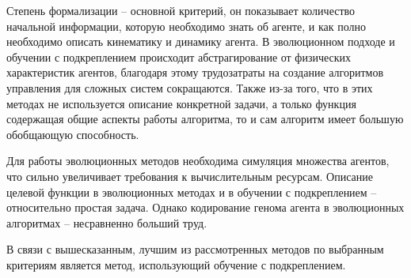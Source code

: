 Степень формализации -- основной критерий, он показывает количество начальной информации, которую необходимо знать об агенте, и как полно необходимо описать кинематику и динамику агента. 
В эволюционном подходе и обучении с подкреплением происходит абстрагирование от физических характеристик агентов, благодаря этому трудозатраты на создание алгоритмов управления для сложных систем сокращаются. 
Также из-за того, что в этих методах не используется описание конкретной задачи, а только функция содержащая общие аспекты работы алгоритма, то и сам алгоритм имеет большую обобщающую способность.

Для работы эволюционных методов необходима симуляция множества агентов, что сильно увеличивает требования к вычислительным ресурсам. 
Описание целевой функции в эволюционных методах и в обучении с подкреплением -- относительно простая задача. Однако кодирование генома агента в эволюционных алгоритмах -- несравненно больший труд.

В связи с вышесказанным, лучшим из рассмотренных методов по выбранным критериям является метод, использующий обучение с подкреплением.

\clearpage


